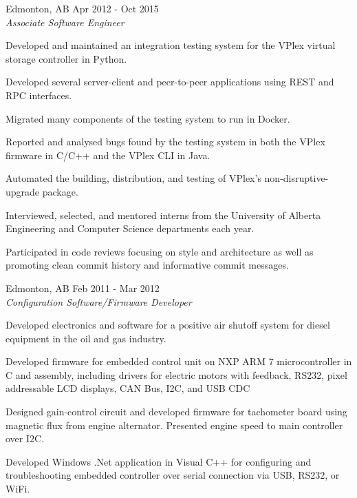 \documentclass[10pt]{article}
\begin{document}
 \hspace{0.5in} Edmonton, AB \hspace{0.5in} Apr 2012 - Oct 2015\\
\emph{Associate Software Engineer}
\begin{mitemize}
  \item Developed and maintained an integration testing system for the
    VPlex virtual storage controller in Python.
  \item Developed several server-client and peer-to-peer applications
    using REST and RPC interfaces.
  \item Migrated many components of the testing system to run in
    Docker.
  \item Reported and analysed bugs found by the testing system in both
    the VPlex firmware in C/C++ and the VPlex CLI in Java.
  \item Automated the building, distribution, and testing of VPlex's
    non-disruptive-upgrade package.
  \item Interviewed, selected, and mentored interns from the
    University of Alberta Engineering and Computer Science departments
    each year.
  \item Participated in code reviews focusing on style and
    architecture as well as promoting clean commit history and
    informative commit messages.
\end{mitemize}

 \hspace{0.5in} Edmonton, AB \hspace{0.5in} Feb 2011 - Mar 2012\\
\emph{Configuration Software/Firmware Developer}
\begin{mitemize}
  \item Developed electronics and software for a positive air shutoff
    system for diesel equipment in the oil and gas industry.
  \item Developed firmware for embedded control unit on NXP ARM 7
    microcontroller in C and assembly, including drivers for electric
    motors with feedback, RS232, pixel addressable LCD displays, CAN
    Bus, I2C, and USB CDC
  \item Designed gain-control circuit and developed firmware for
    tachometer board using magnetic flux from engine
    alternator. Presented engine speed to main controller over I2C.
  \item Developed Windows .Net application in Visual C++ for
    configuring and troubleshooting embedded controller over serial
    connection via USB, RS232, or WiFi.
\end{mitemize}
\end{document}
